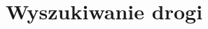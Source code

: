 \documentclass[../doc.tex]{subfiles}
\begin{document}
\section{Wyszukiwanie drogi}


\end{document}
